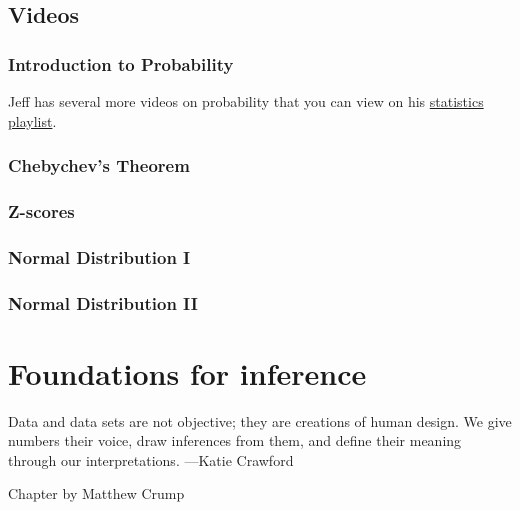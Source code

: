 \documentclass[]{book}
\newenvironment{marginnote}%
  {\itshape}%
  {}
\begin{document}
\hypertarget{videos}{%
\section{Videos}\label{videos}}

\hypertarget{introduction-to-probability}{%
\subsection{Introduction to Probability}\label{introduction-to-probability}}

Jeff has several more videos on probability that you can view on his \href{https://www.youtube.com/playlist?list=PLKXdxQAT3tCvuex_E1ZnQYaw897ELUSaI}{statistics playlist}.

\hypertarget{chebychevs-theorem}{%
\subsection{Chebychev's Theorem}\label{chebychevs-theorem}}

\hypertarget{z-scores-1}{%
\subsection{Z-scores}\label{z-scores-1}}

\hypertarget{normal-distribution-i}{%
\subsection{Normal Distribution I}\label{normal-distribution-i}}

\hypertarget{normal-distribution-ii}{%
\subsection{Normal Distribution II}\label{normal-distribution-ii}}

\hypertarget{foundations-for-inference}{%
\chapter{Foundations for inference}\label{foundations-for-inference}}

{
Data and data sets are not objective; they are creations of human design. We give numbers their voice, draw inferences from them, and define their meaning through our interpretations.
---Katie Crawford
}

\begin{marginnote}

Chapter by Matthew Crump

\end{marginnote}
\end{document}
